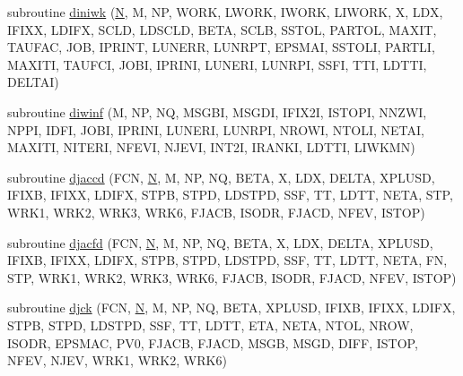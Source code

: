 \begin{DoxyCompactItemize}
\item 
subroutine \hyperlink{d__odr_8f_af64431f47b3bfa0470d27ea0bced09f0}{diniwk} (\hyperlink{polmisc_8c_a0240ac851181b84ac374872dc5434ee4}{N}, M, N\+P, W\+O\+R\+K, L\+W\+O\+R\+K, I\+W\+O\+R\+K, L\+I\+W\+O\+R\+K, X, L\+D\+X, I\+F\+I\+X\+X, L\+D\+I\+F\+X, S\+C\+L\+D, L\+D\+S\+C\+L\+D, B\+E\+T\+A, S\+C\+L\+B, S\+S\+T\+O\+L, P\+A\+R\+T\+O\+L, M\+A\+X\+I\+T, T\+A\+U\+F\+A\+C, J\+O\+B, I\+P\+R\+I\+N\+T, L\+U\+N\+E\+R\+R, L\+U\+N\+R\+P\+T, E\+P\+S\+M\+A\+I, S\+S\+T\+O\+L\+I, P\+A\+R\+T\+L\+I, M\+A\+X\+I\+T\+I, T\+A\+U\+F\+C\+I, J\+O\+B\+I, I\+P\+R\+I\+N\+I, L\+U\+N\+E\+R\+I, L\+U\+N\+R\+P\+I, S\+S\+F\+I, T\+T\+I, L\+D\+T\+T\+I, D\+E\+L\+T\+A\+I)
\item 
subroutine \hyperlink{d__odr_8f_a59a373b31f0f45fbf7e51829c833c003}{diwinf} (M, N\+P, N\+Q, M\+S\+G\+B\+I, M\+S\+G\+D\+I, I\+F\+I\+X2\+I, I\+S\+T\+O\+P\+I, N\+N\+Z\+W\+I, N\+P\+P\+I, I\+D\+F\+I, J\+O\+B\+I, I\+P\+R\+I\+N\+I, L\+U\+N\+E\+R\+I, L\+U\+N\+R\+P\+I, N\+R\+O\+W\+I, N\+T\+O\+L\+I, N\+E\+T\+A\+I, M\+A\+X\+I\+T\+I, N\+I\+T\+E\+R\+I, N\+F\+E\+V\+I, N\+J\+E\+V\+I, I\+N\+T2\+I, I\+R\+A\+N\+K\+I, L\+D\+T\+T\+I, L\+I\+W\+K\+M\+N)
\item 
subroutine \hyperlink{d__odr_8f_afe96a33d2c729fbc3a8b7e4d4a4a5cbd}{djaccd} (F\+C\+N, \hyperlink{polmisc_8c_a0240ac851181b84ac374872dc5434ee4}{N}, M, N\+P, N\+Q, B\+E\+T\+A, X, L\+D\+X, D\+E\+L\+T\+A, X\+P\+L\+U\+S\+D, I\+F\+I\+X\+B, I\+F\+I\+X\+X, L\+D\+I\+F\+X, S\+T\+P\+B, S\+T\+P\+D, L\+D\+S\+T\+P\+D, S\+S\+F, T\+T, L\+D\+T\+T, N\+E\+T\+A, S\+T\+P, W\+R\+K1, W\+R\+K2, W\+R\+K3, W\+R\+K6, F\+J\+A\+C\+B, I\+S\+O\+D\+R, F\+J\+A\+C\+D, N\+F\+E\+V, I\+S\+T\+O\+P)
\item 
subroutine \hyperlink{d__odr_8f_ac2f5d743d80fd57ecfc1f1ad058365c2}{djacfd} (F\+C\+N, \hyperlink{polmisc_8c_a0240ac851181b84ac374872dc5434ee4}{N}, M, N\+P, N\+Q, B\+E\+T\+A, X, L\+D\+X, D\+E\+L\+T\+A, X\+P\+L\+U\+S\+D, I\+F\+I\+X\+B, I\+F\+I\+X\+X, L\+D\+I\+F\+X, S\+T\+P\+B, S\+T\+P\+D, L\+D\+S\+T\+P\+D, S\+S\+F, T\+T, L\+D\+T\+T, N\+E\+T\+A, F\+N, S\+T\+P, W\+R\+K1, W\+R\+K2, W\+R\+K3, W\+R\+K6, F\+J\+A\+C\+B, I\+S\+O\+D\+R, F\+J\+A\+C\+D, N\+F\+E\+V, I\+S\+T\+O\+P)
\item 
subroutine \hyperlink{d__odr_8f_aca8e4b39aacdd658b9cadb95335478d6}{djck} (F\+C\+N, \hyperlink{polmisc_8c_a0240ac851181b84ac374872dc5434ee4}{N}, M, N\+P, N\+Q, B\+E\+T\+A, X\+P\+L\+U\+S\+D, I\+F\+I\+X\+B, I\+F\+I\+X\+X, L\+D\+I\+F\+X, S\+T\+P\+B, S\+T\+P\+D, L\+D\+S\+T\+P\+D, S\+S\+F, T\+T, L\+D\+T\+T, E\+T\+A, N\+E\+T\+A, N\+T\+O\+L, N\+R\+O\+W, I\+S\+O\+D\+R, E\+P\+S\+M\+A\+C, P\+V0, F\+J\+A\+C\+B, F\+J\+A\+C\+D, M\+S\+G\+B, M\+S\+G\+D, D\+I\+F\+F, I\+S\+T\+O\+P, N\+F\+E\+V, N\+J\+E\+V, W\+R\+K1, W\+R\+K2, W\+R\+K6)

\end{DoxyCompactItemize}
